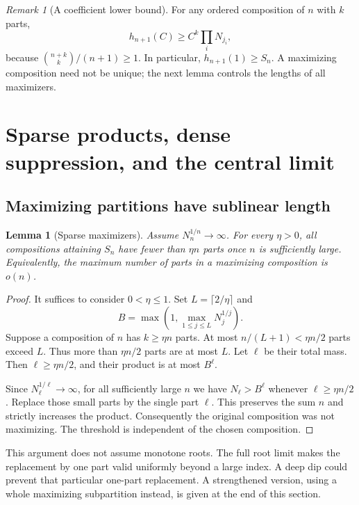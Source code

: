 \documentclass[11pt,a4paper]{article}
\numberwithin{equation}{section}
\newtheorem{lemma}[theorem]{Lemma}
\theoremstyle{definition}
\theoremstyle{remark}
\newtheorem{remark}[theorem]{Remark}
\begin{document}
\begin{remark}[A coefficient lower bound]
\label{rem:lowerpartition}
For any ordered composition of $n$ with $k$ parts,
\begin{equation}
 h_{n+1}(C)\ge C^k\prod_iN_{j_i},
 \label{eq:lowerpartition}
\end{equation}
because $\binom{n+k}{k}/(n+1)\ge1$. In particular,
$h_{n+1}(1)\ge S_n$. A maximizing composition need not be unique; the
next lemma controls the lengths of all maximizers.
\end{remark}

\section{Sparse products, dense suppression, and the central limit}
\label{sec:centralproof}

\subsection{Maximizing partitions have sublinear length}

\begin{lemma}[Sparse maximizers]
\label{lem:sparsemax}
Assume $N_n^{1/n}\to\infty$. For every $\eta>0$, all compositions
attaining $S_n$ have fewer than $\eta n$ parts once $n$ is sufficiently
large. Equivalently, the maximum number of parts in a maximizing
composition is $o(n)$.
\end{lemma}
\begin{proof}
It suffices to consider $0<\eta\le1$. Set $L=\lceil2/\eta\rceil$ and
\[
 B=\max\left(1,\max_{1\le j\le L}N_j^{1/j}\right).
\]
Suppose a composition of $n$ has $k\ge\eta n$ parts. At most
$n/(L+1)<\eta n/2$ parts exceed $L$. Thus more than $\eta n/2$ parts
are at most $L$. Let $\ell$ be their total mass. Then
$\ell\ge\eta n/2$, and their product is at most $B^\ell$.

Since $N_\ell^{1/\ell}\to\infty$, for all sufficiently large $n$ we
have $N_\ell>B^\ell$ whenever $\ell\ge\eta n/2$. Replace those small
parts by the single part $\ell$. This preserves the sum $n$ and strictly
increases the product. Consequently the original composition was not
maximizing. The threshold is independent of the chosen composition.
\end{proof}

This argument does not assume monotone roots. The full root limit makes
the replacement by one part valid uniformly beyond a large index. A deep
dip could prevent that particular one-part replacement. A strengthened
version, using a whole maximizing subpartition instead, is given at the
end of this section.
\end{document}
